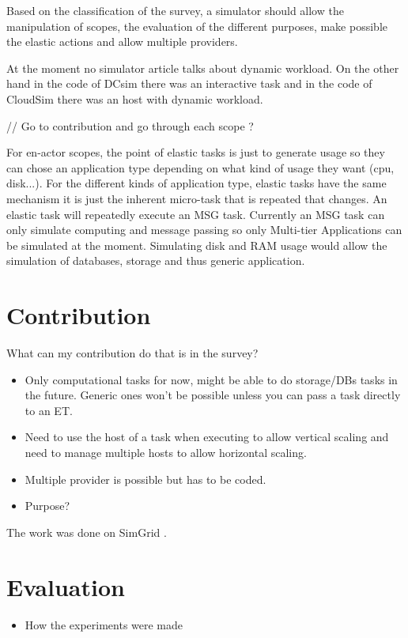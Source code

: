 \documentclass[a4paper]{IEEEtran}
\begin{document}
  Based on the classification of the survey, a simulator should allow the
  manipulation of scopes, the evaluation of the different purposes, make
  possible the elastic actions and allow multiple providers.


  At the moment no simulator article talks about dynamic workload. On the other
  hand in the code of DCsim \cite{tighe2013towards} there was an interactive
  task and in the code of CloudSim \cite{calheiros2011cloudsim} there was an
  host with dynamic workload.
  
  // Go to contribution and go through each scope ?
  
  For en-actor scopes, the point of elastic tasks is just to generate usage so
  they can chose an application type depending on what kind of usage they want
  (cpu, disk...). For the different kinds of application type, elastic tasks
  have the same mechanism it is just the inherent micro-task that is repeated
  that changes. An elastic task will repeatedly execute an MSG task. Currently
  an MSG task can only simulate computing and message passing so only Multi-tier
  Applications can be simulated at the moment. Simulating disk and RAM usage
  would allow the simulation of databases, storage and thus generic application.
       

\section{Contribution} \label{contrib}
  What can my contribution do that is in the survey?
  \begin{itemize}
    \item Only computational tasks for now, might be able to do storage/DBs
    tasks in the future. Generic ones won't be possible unless you can pass a
    task directly to an ET.
    \item Need to use the host of a task when executing to allow vertical
    scaling and need to manage multiple hosts to allow horizontal scaling.
    \item Multiple provider is possible but has to be coded.
    \item Purpose?
  \end{itemize}
  
  The work was done on SimGrid \cite{casanova:hal-01017319}.

\section{Evaluation} \label{eval}
  \begin{itemize}
    \item How the experiments were made
  \end{itemize}
  
\end{document}
